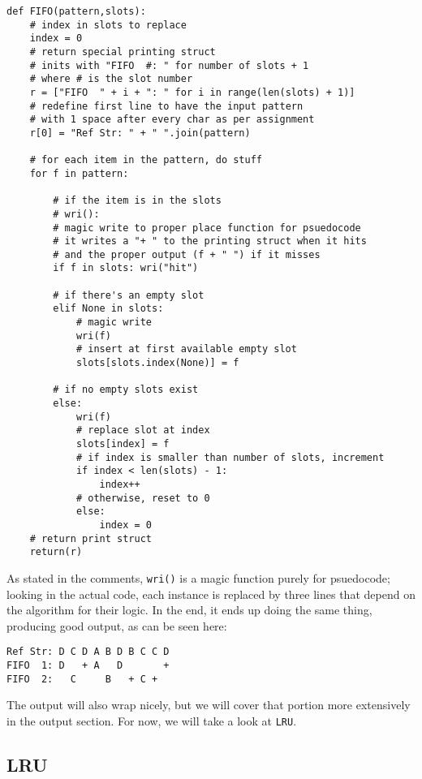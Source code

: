 \documentclass[11pt]{article}
\begin{document}
\begin{lstlisting}
def FIFO(pattern,slots):
	# index in slots to replace
	index = 0
	# return special printing struct
	# inits with "FIFO  #: " for number of slots + 1
	# where # is the slot number
	r = ["FIFO  " + i + ": " for i in range(len(slots) + 1)]
	# redefine first line to have the input pattern
	# with 1 space after every char as per assignment
	r[0] = "Ref Str: " + " ".join(pattern)

	# for each item in the pattern, do stuff
	for f in pattern:

		# if the item is in the slots
		# wri():
		# magic write to proper place function for psuedocode
		# it writes a "+ " to the printing struct when it hits
		# and the proper output (f + " ") if it misses
		if f in slots: wri("hit")

		# if there's an empty slot
		elif None in slots:
			# magic write
			wri(f)
			# insert at first available empty slot
			slots[slots.index(None)] = f

		# if no empty slots exist
		else:
			wri(f)
			# replace slot at index
			slots[index] = f
			# if index is smaller than number of slots, increment
			if index < len(slots) - 1:
				index++
			# otherwise, reset to 0
			else:
				index = 0
	# return print struct
	return(r)

\end{lstlisting}

As stated in the comments, \texttt{wri()} is a magic function purely for psuedocode; looking in the actual code, each instance is replaced by three lines that depend on the algorithm for their logic.
In the end, it ends up doing the same thing, producing good output, as can be seen here:

\begin{lstlisting}
Ref Str: D C D A B D B C C D
FIFO  1: D   + A   D       +
FIFO  2:   C     B   + C +
\end{lstlisting}

The output will also wrap nicely, but we will cover that portion more extensively in the output section. For now, we will take a look at \texttt{LRU}.

\subsection{LRU}
\end{document}
